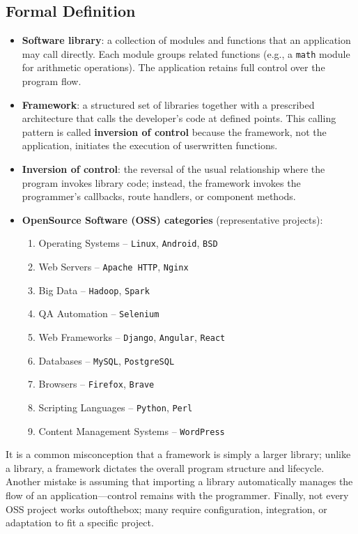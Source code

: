 \documentclass[12pt, a4paper]{article}
\begin{document}
\subsection{Formal Definition}
\begin{itemize}
  \item \textbf{Software library}: a collection of modules and functions that an application may call directly.  Each module groups related functions (e.g., a \texttt{math} module for arithmetic operations).  The application retains full control over the program flow.
  \item \textbf{Framework}: a structured set of libraries together with a prescribed architecture that calls the developer's code at defined points.  This calling pattern is called \textbf{inversion of control} because the framework, not the application, initiates the execution of userwritten functions.
  \item \textbf{Inversion of control}: the reversal of the usual relationship where the program invokes library code; instead, the framework invokes the programmer's callbacks, route handlers, or component methods.
  \item \textbf{OpenSource Software (OSS) categories} (representative projects):
    \begin{enumerate}
      \item Operating Systems -- \texttt{Linux}, \texttt{Android}, \texttt{BSD}
      \item Web Servers -- \texttt{Apache HTTP}, \texttt{Nginx}
      \item Big Data -- \texttt{Hadoop}, \texttt{Spark}
      \item QA Automation -- \texttt{Selenium}
      \item Web Frameworks -- \texttt{Django}, \texttt{Angular}, \texttt{React}
      \item Databases -- \texttt{MySQL}, \texttt{PostgreSQL}
      \item Browsers -- \texttt{Firefox}, \texttt{Brave}
      \item Scripting Languages -- \texttt{Python}, \texttt{Perl}
      \item Content Management Systems -- \texttt{WordPress}
    \end{enumerate}
\end{itemize}
It is a common misconception that a framework is simply a larger library; unlike a library, a framework dictates the overall program structure and lifecycle.  Another mistake is assuming that importing a library automatically manages the flow of an application---control remains with the programmer.  Finally, not every OSS project works outofthebox; many require configuration, integration, or adaptation to fit a specific project.  
\end{document}
